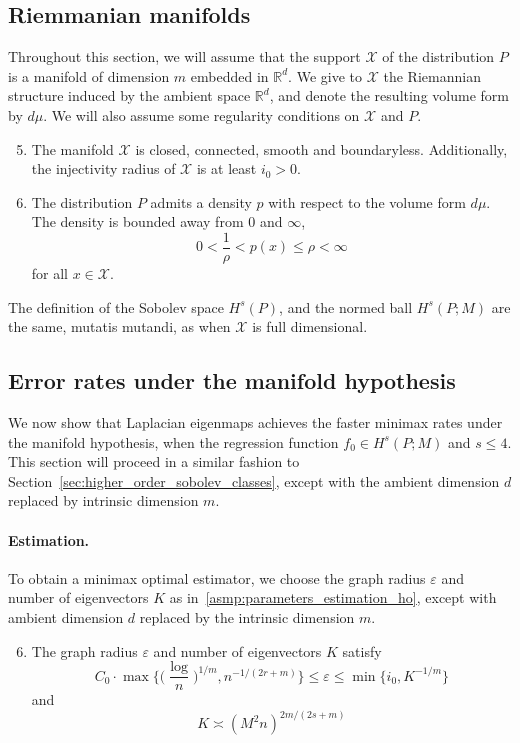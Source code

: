 \documentclass{article}
\newcommand{\Reals}{\mathbb{R}}
\newcommand{\1}{\mathbf{1}}
\newcommand{\Rd}{\Reals^d}
\newcommand{\mc}[1]{\mathcal{#1}}
\theoremstyle{alden}
\theoremstyle{aldenthm}
\theoremstyle{definition}
\theoremstyle{remark}
\begin{document}
\subsection{Riemmanian manifolds}
Throughout this section, we will assume that the support $\mc{X}$ of the distribution $P$ is a manifold of dimension $m$ embedded in $\Rd$. We give to $\mc{X}$ the Riemannian structure induced by the ambient space $\Rd$, and denote the resulting volume form by $d\mu$.  We will also assume some regularity conditions on $\mc{X}$ and $P$. 
\begin{enumerate}[label=(A\arabic*)]
	\setcounter{enumi}{4}
	\item 
	\label{asmp:domain_manifold} The manifold $\mc{X}$ is closed, connected, smooth and boundaryless. Additionally, the injectivity radius of $\mc{X}$ is at least $i_0 > 0$.
	\item 
	\label{asmp:density_manifold} The distribution $P$ admits a density $p$ with respect to the volume form $d\mu$. The density is bounded away from $0$ and $\infty$,
	\begin{equation*}
	0 < \frac{1}{\rho} < p(x) \leq \rho < \infty
	\end{equation*}
	for all $x \in \mc{X}$.
\end{enumerate}
The definition of the Sobolev space $H^s(P)$, and the normed ball $H^s(P;M)$ are the same, mutatis mutandi, as when $\mc{X}$ is full dimensional. 

\subsection{Error rates under the manifold hypothesis}
We now show that Laplacian eigenmaps achieves the faster minimax rates under the manifold hypothesis, when the regression function $f_0 \in H^s(P;M)$ and $s \leq 4$. This section will proceed in a similar fashion to Section~\ref{sec:higher_order_sobolev_classes}, except with the ambient dimension $d$ replaced by intrinsic dimension $m$. 

\paragraph{Estimation.}
To obtain a minimax optimal estimator, we choose the graph radius $\varepsilon$ and number of eigenvectors $K$ as in~\ref{asmp:parameters_estimation_ho}, except with ambient dimension $d$ replaced by the intrinsic dimension $m$.

\begin{enumerate}[label=(A\arabic*)]
	\setcounter{enumi}{5}
	\item 
	\label{asmp:parameters_estimation_manifold}
	The graph radius $\varepsilon$ and number of eigenvectors $K$ satisfy
	\begin{equation}
	\label{eqn:radius_estimation_manifold}
	C_0 \cdot \max\biggl\{\biggl(\frac{\log}{n}\biggr)^{1/m}, n^{-1/(2r + m)}\biggr\} \leq \varepsilon \leq \min\{i_0, K^{-1/m}\}
	\end{equation}
	and
	\begin{equation*}
	K \asymp (M^2n)^{2m/(2s + m)}
	\end{equation*}
\end{enumerate}
\end{document}
